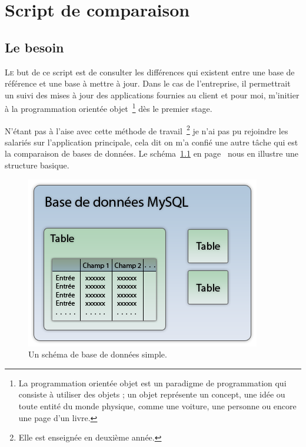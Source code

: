 \chapter{Script de comparaison} %
\label{cha:Script de comparaison}

\section{Le besoin} %
\label{sec:Le besoin}

\lettrine{L}{e} but de ce script est de consulter les différences qui
existent entre une base de référence et une base à mettre à jour. Dans
le cas de l'entreprise, il permettrait un suivi des mises à jour des
applications fournies au client et pour moi, m'initier à la
programmation orientée objet\, \footnote{La programmation orientée objet
est un paradigme de programmation qui consiste à utiliser des objets ;
un objet représente un concept, une idée ou toute entité du monde
physique, comme une voiture, une personne ou encore une page d'un
livre.} dès le premier stage.

N'étant pas à l'aise avec cette méthode de travail\, \footnote{Elle est
enseignée en deuxième année.} je n'ai pas pu rejoindre les salariés sur
l'application principale, cela dit on m'a confié une autre tâche qui est
la comparaison de bases de données. Le schéma~\ref{bdd} en
page~\pageref{bdd} nous en illustre une structure basique.

\begin{figure}
    \begin{center}
        \includegraphics[scale=0.7]{images/bdd.png}
        \caption{Un schéma de base de données simple.}
        \label{bdd}
    \end{center}
\end{figure}

